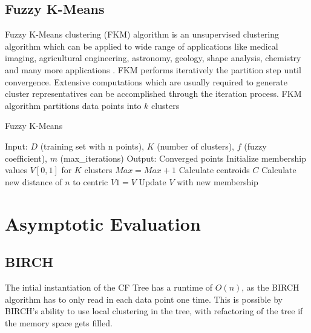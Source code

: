 \documentclass[conference, 10pt]{IEEEtran}
\begin{document}
  \subsection{Fuzzy K-Means}
  Fuzzy K-Means clustering (FKM) algorithm is an unsupervised clustering algorithm which can be
  applied to wide range of applications like medical imaging, agricultural engineering, astronomy,
  geology, shape analysis, chemistry and many more applications \cite{pattern}. FKM performs iteratively the partition step until convergence. Extensive computations which are usually required to generate cluster representatives can be accomplished through the iteration process. FKM algorithm partitions data points into $k$ clusters

  \begin{algorithm}
  \caption{Fuzzy K-Means}
  \begin{algorithmic}[1]
  \State Input: $D$ (training set with n points), $K$ (number of clusters), $f$ (fuzzy coefficient), $m$ (max\_iterations)
  \State Output: Converged points
    \State Initialize membership values $V[0,1]$ for $K$ clusters
    \State $Max=Max+1$
          \State Calculate centroids $C$
          \State Calculate new distance of $n$ to centric
          \State $V1 = V$
          \State Update $V$ with new membership
      \EndFor
    \EndFor
  \EndProcedure
  \Statex
  \end{algorithmic}
  \end{algorithm}


  \section{Asymptotic Evaluation}

  \subsection{BIRCH}
  The intial instantiation of the CF Tree has a runtime of $O(n)$, as the BIRCH algorithm has to only read in each data point one time. This is possible by BIRCH's ability to use local clustering in the tree, with refactoring of the tree if the memory space gets filled.
\end{document}
